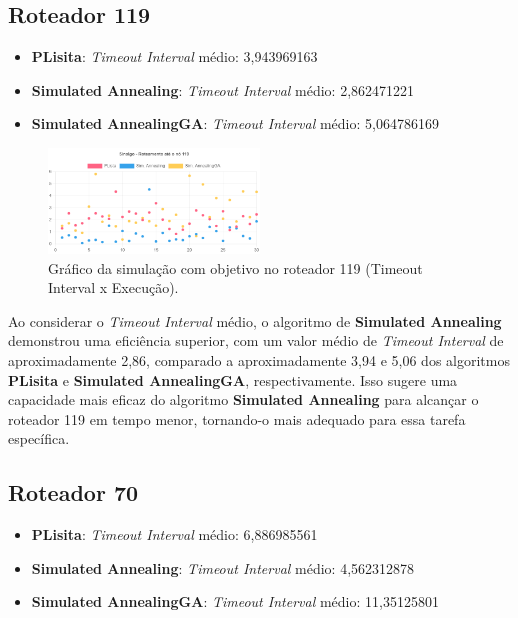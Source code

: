 \documentclass[conference]{IEEEtran}
\begin{document}
\subsection{Roteador 119}

\begin{itemize}
    \item \textbf{PLisita}: \textit{Timeout Interval} médio: 3,943969163
    \item \textbf{Simulated Annealing}: \textit{Timeout Interval} médio: 2,862471221
    \item \textbf{Simulated AnnealingGA}: \textit{Timeout Interval} médio: 5,064786169
\end{itemize}

\begin{figure}[h]
    \centering
    \includegraphics[width=0.5\textwidth]{chart_timeout_interval_119}
    \caption{Gráfico da simulação com objetivo no roteador 119 (Timeout Interval x Execução).}
    \label{fig:exemplo}
\end{figure}

Ao considerar o \textit{Timeout Interval} médio, o algoritmo de \textbf{Simulated Annealing} demonstrou uma eficiência superior, com um valor médio de \textit{Timeout Interval} de aproximadamente 2,86, comparado a aproximadamente 3,94 e 5,06 dos algoritmos \textbf{PLisita} e \textbf{Simulated AnnealingGA}, respectivamente. Isso sugere uma capacidade mais eficaz do algoritmo \textbf{Simulated Annealing} para alcançar o roteador 119 em tempo menor, tornando-o mais adequado para essa tarefa específica.

\subsection{Roteador 70}

\begin{itemize}
    \item \textbf{PLisita}: \textit{Timeout Interval} médio: 6,886985561
    \item \textbf{Simulated Annealing}: \textit{Timeout Interval} médio: 4,562312878
    \item \textbf{Simulated AnnealingGA}: \textit{Timeout Interval} médio: 11,35125801
\end{itemize}
\end{document}
